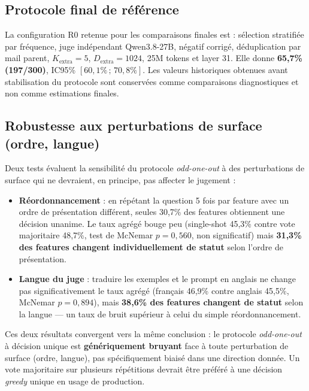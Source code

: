 \documentclass[11pt]{article}
\begin{document}
\subsection{Protocole final de référence}
\label{subsec:protocole-final}

\begin{resultbox}
La configuration R0 retenue pour les comparaisons finales est : sélection stratifiée
par fréquence, juge indépendant Qwen3.8-27B, négatif corrigé, déduplication par mail
parent, $K_\text{extra}=5$, $D_\text{extra}=1024$, 25M tokens et layer 31. Elle donne
\textbf{65,7\% (197/300)}, IC95\% $[60{,}1\%\,;\,70{,}8\%]$.
Les valeurs historiques obtenues avant stabilisation du protocole sont conservées
comme comparaisons diagnostiques et non comme estimations finales.
\end{resultbox}

\subsection{Robustesse aux perturbations de surface (ordre, langue)}
\label{subsec:robustesse}

Deux tests évaluent la sensibilité du protocole \emph{odd-one-out} à des
perturbations de surface qui ne devraient, en principe, pas affecter le
jugement :

\begin{itemize}
  \item \textbf{Réordonnancement} : en répétant la question 5 fois par
    feature avec un ordre de présentation différent, seules 30,7\% des
    features obtiennent une décision unanime. Le taux agrégé bouge peu
    (single-shot 45,3\% contre vote majoritaire 48,7\%, test de McNemar
    $p=0,560$, non significatif) mais \textbf{31,3\% des features changent
    individuellement de statut} selon l'ordre de présentation.
  \item \textbf{Langue du juge} \cite{resck2025multilingual, multilingualconcepts2025} : traduire les exemples et le prompt en
    anglais ne change pas significativement le taux agrégé (français 46,9\%
    contre anglais 45,5\%, McNemar $p=0,894$), mais \textbf{38,6\% des
    features changent de statut} selon la langue --- un taux de bruit
    supérieur à celui du simple réordonnancement.
\end{itemize}

Ces deux résultats convergent vers la même conclusion : le protocole
\emph{odd-one-out} à décision unique est \textbf{génériquement bruyant} face
à toute perturbation de surface (ordre, langue), pas spécifiquement biaisé
dans une direction donnée. Un vote majoritaire sur plusieurs répétitions
devrait être préféré à une décision \emph{greedy} unique en usage de
production.
\end{document}
